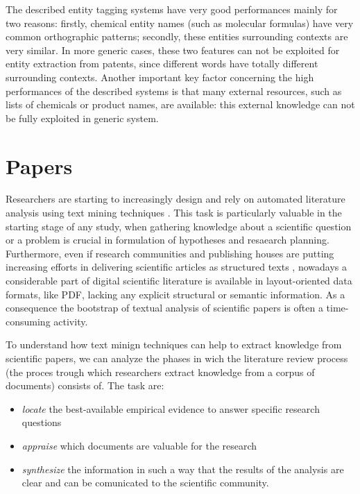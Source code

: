 \documentclass[]{book}
\providecommand{\tightlist}{%
  \setlength{\itemsep}{0pt}\setlength{\parskip}{0pt}}
\theoremstyle{definition}
\theoremstyle{definition}
\theoremstyle{definition}
\theoremstyle{remark}
\begin{document}
The described entity tagging systems have very good performances mainly
for two reasons: firstly, chemical entity names (such as molecular
formulas) have very common orthographic patterns; secondly, these
entities surrounding contexts are very similar. In more generic cases,
these two features can not be exploited for entity extraction from
patents, since different words have totally different surrounding
contexts. Another important key factor concerning the high performances
of the described systems is that many external resources, such as lists
of chemicals or product names, are available: this external knowledge
can not be fully exploited in generic system.

\section{Papers}\label{sotadocumentspapers}

Researchers are starting to increasingly design and rely on automated
literature analysis using text mining techniques \citep{nuzzo2010text}.
This task is particularly valuable in the starting stage of any study,
when gathering knowledge about a scientific question or a problem is
crucial in formulation of hypotheses and resaearch planning.
Furthermore, even if research communities and publishing houses are
putting increasing efforts in delivering scientific articles as
structured texts \citep{poelmans2012text}, nowadays a considerable part
of digital scientific literature is available in layout-oriented data
formats, like PDF, lacking any explicit structural or semantic
information. As a consequence the bootstrap of textual analysis of
scientific papers is often a time-consuming activity.

To understand how text minign techniques can help to extract knowledge
from scientific papers, we can analyze the phases in wich the literature
review process (the proces trough which researchers extract knowledge
from a corpus of documents) consists of. The task are:

\begin{itemize}
\tightlist
\item
  \emph{locate} the best-available empirical evidence to answer specific
  research questions
\item
  \emph{appraise} which documents are valuable for the research
\item
  \emph{synthesize} the information in such a way that the results of
  the analysis are clear and can be comunicated to the scientific
  community.
\end{itemize}
\end{document}
